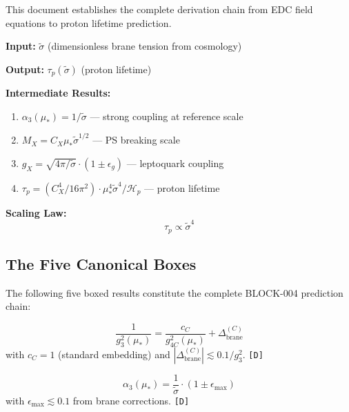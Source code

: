 \documentclass[11pt,a4paper]{article}
\newcommand{\tagD}{\textcolor{green!50!black}{\texttt{[D]}}}
\theoremstyle{definition}
\begin{document}
\begin{canonbox}
This document establishes the complete derivation chain from EDC field equations
to proton lifetime prediction.

\textbf{Input:} $\tilde{\sigma}$ (dimensionless brane tension from cosmology)

\textbf{Output:} $\tau_p(\tilde{\sigma})$ (proton lifetime)

\textbf{Intermediate Results:}
\begin{enumerate}
  \item $\alpha_3(\mu_*) = 1/\tilde{\sigma}$ --- strong coupling at reference scale
  \item $M_X = C_X \mu_* \tilde{\sigma}^{1/2}$ --- PS breaking scale
  \item $g_X = \sqrt{4\pi/\tilde{\sigma}} \cdot (1 \pm \epsilon_g)$ --- leptoquark coupling
  \item $\tau_p = (C_X^4/16\pi^2) \cdot \mu_*^4 \tilde{\sigma}^4 / \mathcal{H}_p$ --- proton lifetime
\end{enumerate}

\textbf{Scaling Law:}
\begin{equation}
\label{eq:scaling-summary}
\boxed{\tau_p \propto \tilde{\sigma}^4}
\end{equation}
\end{canonbox}

\subsection{The Five Canonical Boxes}
\label{subsec:five-boxes}

The following five boxed results constitute the complete BLOCK-004 prediction chain:

\begin{boxone}
\begin{equation}
\label{eq:box1-color-matching}
\boxed{\frac{1}{g_3^2(\mu_*)} = \frac{c_C}{g_{4C}^2(\mu_*)} + \Delta_{\text{brane}}^{(C)}}
\end{equation}
with $c_C = 1$ (standard embedding) and $|\Delta_{\text{brane}}^{(C)}| \lesssim 0.1/g_3^2$. \tagD{}
\end{boxone}

\begin{boxtwo}
\begin{equation}
\label{eq:box2-alpha3}
\boxed{\alpha_3(\mu_*) = \frac{1}{\tilde{\sigma}} \cdot (1 \pm \epsilon_{\max})}
\end{equation}
with $\epsilon_{\max} \lesssim 0.1$ from brane corrections. \tagD{}
\end{boxtwo}
\end{document}

